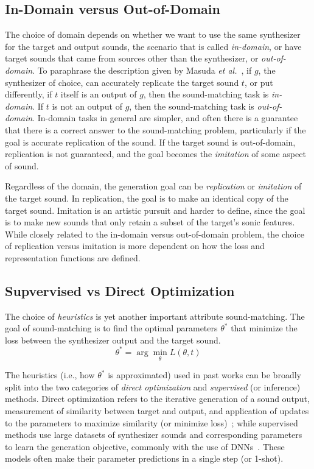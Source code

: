 \documentclass[lettersize,journal]{IEEEtran}
\begin{document}
\subsection{In-Domain versus Out-of-Domain}
\label{sec:in-domain}
The choice of domain depends on whether we want to use the same synthesizer for the target and output sounds, the scenario that is called \textit{in-domain}, or have target sounds that came from sources other than the synthesizer, or \textit{out-of-domain}. To paraphrase the description given by Masuda \textit{et al.}~\cite{masuda2021soundmatch}, if $g$, the synthesizer of choice, can accurately replicate the target sound $t$, or put differently, if $t$ itself is an output of $g$, then the sound-matching task is \textit{in-domain}. If $t$ is not an output of $g$, then the sound-matching task is \textit{out-of-domain}. In-domain tasks in general are simpler, and often there is a guarantee that there is a correct answer to the sound-matching problem, particularly if the goal is accurate replication of the sound. If the target sound is out-of-domain, replication is not guaranteed, and the goal becomes the \textit{imitation} of some aspect of sound. 

Regardless of the domain, the generation goal can be \textit{replication} or \textit{imitation} of the target sound. In replication, the goal is to make an identical copy of the target sound. Imitation is an artistic pursuit and harder to define, since the goal is to make new sounds that only retain a subset of the target's sonic features. While closely related to the in-domain versus out-of-domain problem, the choice of replication versus imitation is more dependent on how the loss and representation functions are defined. 

\subsection{Supvervised vs Direct Optimization}
\label{sec:optimization}

The choice of \textit{heuristics} is yet another important attribute sound-matching. The goal of sound-matching is to find the optimal parameters $\theta^*$ that minimize the loss between the synthesizer output and the target sound. 
\[
\theta^* = \arg\min_{\theta} L(\theta,t)
\]

The heuristics (i.e., how $\theta^*$ is approximated) used in past works can be broadly split into the two categories of \textit{direct optimization} and \textit{supervised}  (or inference) methods. Direct optimization refers to the iterative generation of a sound output, measurement of similarity between target and output, and application of updates to the parameters to maximize similarity (or minimize loss)~\cite{horner1993machine,mitchell2007evolutionary,yee2018automatic,vahidi2023mesostructures}; while supervised methods use large datasets of synthesizer sounds and corresponding parameters to learn the generation objective, commonly with the use of DNNs~\cite{engel2020ddsp,salimi2020make,yee2018automatic,esling2019flow}. These models often make their parameter predictions in a single step (or 1-shot). 
\end{document}
